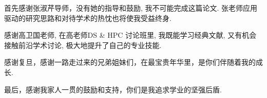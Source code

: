 ﻿\begin{thanks}
  首先感谢张淑芹导师，没有她的指导和鼓励, 我不可能完成这篇论文. 
  张老师应用驱动的研究思路和对待学术的热忱也将使我受益终身.

  感谢高卫国老师, 在高老师DS \& HPC 讨论班里, 我既能学习经典文献, 
  又有机会接触前沿学术讨论, 极大地提升了自己的专业技能.

  感谢复旦，感谢一路走过来的兄弟姐妹们，在最宝贵年华里，是你们伴随着我的成长.

  最后，感谢我家人一贯的鼓励和支持，你们是我追求学业的坚强后盾.

\end{thanks}
